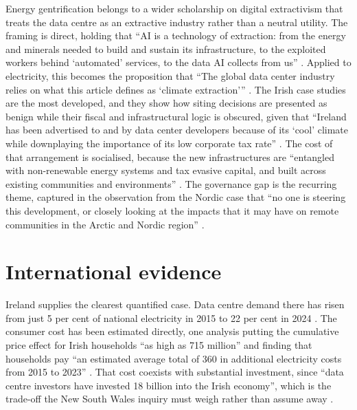 Energy gentrification belongs to a wider scholarship on digital extractivism that treats the data centre as an extractive industry rather than a neutral utility. The framing is direct, holding that \enquote{AI is a technology of extraction: from the energy and minerals needed to build and sustain its infrastructure, to the exploited workers behind \enquote{automated} services, to the data AI collects from us} \autocite{crawfordAtlasAIPower2021}. Applied to electricity, this becomes the proposition that \enquote{The global data center industry relies on what this article defines as \enquote{climate extraction}} \autocite{brodieClimateExtractionSupply2020}. The Irish case studies are the most developed, and they show how siting decisions are presented as benign while their fiscal and infrastructural logic is obscured, given that \enquote{Ireland has been advertised to and by data center developers because of its \enquote{cool} climate while downplaying the importance of its low corporate tax rate} \autocite{brodieClimateExtractionSupply2020}. The cost of that arrangement is socialised, because the new infrastructures are \enquote{entangled with non-renewable energy systems and tax evasive capital, and built across existing communities and environments} \autocite{bresnihanNewExtractiveFrontiers2021}. The governance gap is the recurring theme, captured in the observation from the Nordic case that \enquote{no one is steering this development, or closely looking at the impacts that it may have on remote communities in the Arctic and Nordic region} \autocite{sovacoolWholeSystemsEnergy2022}.

\section{International evidence}
\label{sec:supp:gen:intl}

Ireland supplies the clearest quantified case. Data centre demand there has risen from just 5 per cent of national electricity in 2015 to 22 per cent in 2024 \autocite{irishTimesDataCentreBills2026}. The consumer cost has been estimated directly, one analysis putting the cumulative price effect for Irish households \enquote{as high as \texteuro{}715 million} and finding that households pay \enquote{an estimated average total of \texteuro{}360 in additional electricity costs from 2015 to 2023} \autocite{irishTimesDataCentreBills2026}. That cost coexists with substantial investment, since \enquote{data centre investors have invested \texteuro{}18 billion into the Irish economy}, which is the trade-off the New South Wales inquiry must weigh rather than assume away \autocite{irishTimesDataCentreBills2026}.

